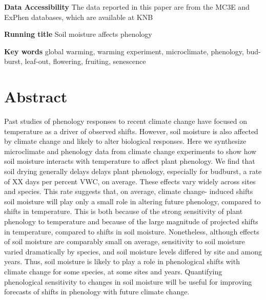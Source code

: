 \documentclass{article}
\begin{document}
\begin{singlespace}
\textbf{Data Accessibility} %
The data reported in this paper are from the MC3E and ExPhen databases, which are available at KNB \citep{ettinger2018,ettinger2019}

\textbf{Running title} Soil moisture affects phenology


\textbf{Key words} global warming, warming experiment, microclimate, phenology, bud-burst, leaf-out, flowering, fruiting, senescence 
\end{singlespace}


\clearpage
\section*{Abstract}
Past studies of phenology responses to recent climate change have focused on temperature as a driver of observed shifts. However, soil moisture is also affected by climate change and likely to alter biological responses. Here we synthesize microclimate and phenology data from climate change experiments to show how soil moisture interacts with temperature to affect plant phenology. We find that soil drying generally delays delays plant phenology, especially for budburst, a rate of XX days per percent VWC, on average. These effects vary widely across sites and species. This rate suggests that, on average, climate change- induced shifts soil moisture will play only a small role in altering future phenology, compared to shifts in temperature. This is both because of the strong sensitivity of plant phenology to temperature and because of the large magnitude of projected shifts in temperature, compared to shifts in soil moisture. Nonetheless, although effects of soil moisture are comparably small on average, sensitivity to soil moisture varied dramatically by species, and soil moisture levels differed by site and among years. Thus, soil moisture is likely to play a role in phenological shifts with climate change for some species, at some sites and years. Quantifying phenological sensitivity to changes in soil moisture will be useful for improving forecasts of shifts in phenology with future climate change.  
\end{document}
